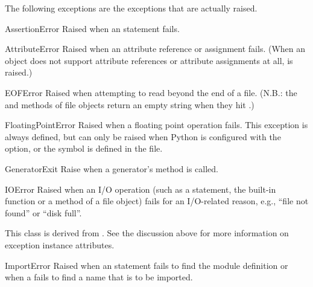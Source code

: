 
The following exceptions are the exceptions that are actually raised.

\begin{excdesc}{AssertionError}
Raised when an  statement fails.
\end{excdesc}

\begin{excdesc}{AttributeError}
  Raised when an attribute reference or assignment fails.  (When an
  object does not support attribute references or attribute assignments
  at all,  is raised.)
\end{excdesc}

\begin{excdesc}{EOFError}
  Raised when attempting to read beyond the end of a file.
  (N.B.: the  and  methods of file
  objects return an empty string when they hit \EOF.)
\end{excdesc}

\begin{excdesc}{FloatingPointError}
  Raised when a floating point operation fails.  This exception is
  always defined, but can only be raised when Python is configured
  with the  option, or the
   symbol is defined in the
   file.
\end{excdesc}

\begin{excdesc}{GeneratorExit}
  Raise when a generator's  method is called.
\end{excdesc}

\begin{excdesc}{IOError}
  Raised when an I/O operation (such as a  statement,
  the built-in  function or a method of a file
  object) fails for an I/O-related reason, e.g., ``file not found'' or
  ``disk full''.

  This class is derived from .  See the
  discussion above for more information on exception instance
  attributes.
\end{excdesc}

\begin{excdesc}{ImportError}
  Raised when an  statement fails to find the module
  definition or when a  fails to find a
  name that is to be imported.
\end{excdesc}

